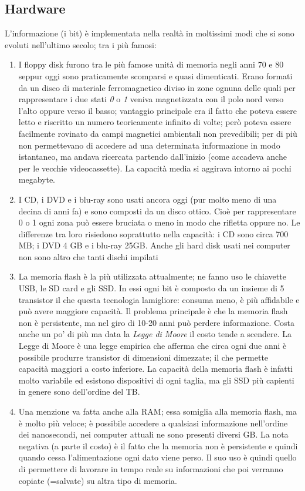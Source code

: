 \subsection{Hardware}
L'informazione (i bit) è implementata nella realtà in moltissimi modi che si sono evoluti nell'ultimo secolo; tra i più famosi:
\begin{enumerate}
\item I floppy disk furono tra le più famose unità di memoria negli anni 70 e 80 seppur oggi sono praticamente scomparsi e quasi dimenticati. Erano formati da un disco di materiale ferromagnetico diviso in zone ognuna delle quali per rappresentare i due stati \textit{0} o \textit{1} veniva magnetizzata con il polo nord verso l'alto oppure verso il basso; vantaggio principale era il fatto che poteva essere letto e riscritto un numero teoricamente infinito di volte; però poteva essere facilmente rovinato da campi magnetici ambientali non prevedibili; per di più non permettevano di accedere ad una determinata informazione in modo istantaneo, ma andava ricercata partendo dall'inizio (come accadeva anche per le vecchie videocassette). La capacità media si aggirava intorno ai pochi megabyte.
\item I CD, i DVD e i blu-ray sono usati ancora oggi (pur molto meno di una decina di anni fa) e sono composti da un disco ottico. Cioè per rappresentare 0 o 1 ogni zona può essere bruciata o meno in modo che rifletta oppure no. Le differenze tra loro risiedono soprattutto nella capacità: i CD sono circa 700 MB; i DVD 4 GB e i blu-ray 25GB. Anche gli hard disk usati nei computer non sono altro che tanti dischi impilati
\item La memoria flash è la più utilizzata attualmente; ne fanno uso le chiavette USB, le SD card e gli SSD. In essi ogni bit è composto da un insieme di 5 transistor il che questa tecnologia  lamigliore: consuma meno, è più affidabile e può avere maggiore capacità. Il problema principale è che la memoria flash non è persistente, ma nel giro di 10-20 anni può perdere informazione. Costa anche un po' di più ma data la \textit{Legge di Moore} il costo tende a scendere. La Legge di Moore è una legge empirica che afferma che circa ogni due anni è possibile produrre transistor di dimensioni dimezzate; il che permette capacità maggiori a costo inferiore. La capacità della memoria flash è infatti molto variabile ed esistono dispositivi di ogni taglia, ma gli SSD più capienti in genere sono dell'ordine del TB.
\item Una menzione va fatta anche alla RAM; essa somiglia alla memoria flash, ma è molto più veloce; è possibile accedere a qualsiasi informazione nell'ordine dei nanosecondi, nei computer attuali ne sono presenti diversi GB. La nota negativa (a parte il costo) è il fatto che la memoria non è persistente e quindi quando cessa l'alimentazione ogni dato viene perso. Il suo uso è quindi quello di permettere di lavorare in tempo reale su informazioni che poi verranno copiate (=salvate) su altra tipo di memoria.
\end{enumerate}
